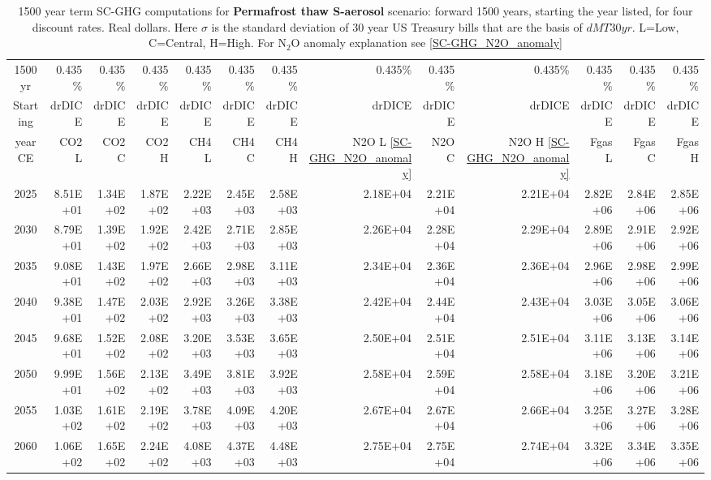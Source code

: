 \documentclass{article}
\begin{document}
\begin{table}
   \caption{1500 year term SC-GHG computations for \textbf{Permafrost thaw S-aerosol} scenario: forward 1500 years, starting the year listed, for four discount rates. Real dollars. Here $\sigma$ is the standard deviation of 30 year US Treasury bills that are the basis of $dMT30yr$. L=Low, C=Central, H=High. For N$_2$O anomaly explanation see \ref{SC-GHG_N2O_anomaly}} 
\label{PVs_1500_yearSCC_SH4}
\small
\begin{tabular}{crrr|rrr|rrr|rrr}
1500 yr  & 0.435\%  & 0.435\%  & 0.435\%  & 0.435\%  & 0.435\%  & 0.435\%  & 0.435\%  & 0.435\%  & 0.435\%  & 0.435\%  & 0.435\%  & 0.435\%  \\
Starting & drDICE   & drDICE   & drDICE   & drDICE   & drDICE   & drDICE   & drDICE   & drDICE   & drDICE   & drDICE   & drDICE   & drDICE   \\
year CE  & CO2 L    & CO2 C    & CO2 H    & CH4 L    & CH4 C    & CH4 H    & N2O L \ref{SC-GHG_N2O_anomaly}     & N2O C      & N2O H \ref{SC-GHG_N2O_anomaly}    & Fgas L   & Fgas C   & Fgas H   \\
2025     & 8.51E+01 & 1.34E+02 & 1.87E+02 & 2.22E+03 & 2.45E+03 & 2.58E+03 & 2.18E+04 & 2.21E+04 & 2.21E+04 & 2.82E+06 & 2.84E+06 & 2.85E+06 \\
2030     & 8.79E+01 & 1.39E+02 & 1.92E+02 & 2.42E+03 & 2.71E+03 & 2.85E+03 & 2.26E+04 & 2.28E+04 & 2.29E+04 & 2.89E+06 & 2.91E+06 & 2.92E+06 \\
2035     & 9.08E+01 & 1.43E+02 & 1.97E+02 & 2.66E+03 & 2.98E+03 & 3.11E+03 & 2.34E+04 & 2.36E+04 & 2.36E+04 & 2.96E+06 & 2.98E+06 & 2.99E+06 \\
2040     & 9.38E+01 & 1.47E+02 & 2.03E+02 & 2.92E+03 & 3.26E+03 & 3.38E+03 & 2.42E+04 & 2.44E+04 & 2.43E+04 & 3.03E+06 & 3.05E+06 & 3.06E+06 \\
2045     & 9.68E+01 & 1.52E+02 & 2.08E+02 & 3.20E+03 & 3.53E+03 & 3.65E+03 & 2.50E+04 & 2.51E+04 & 2.51E+04 & 3.11E+06 & 3.13E+06 & 3.14E+06 \\
2050     & 9.99E+01 & 1.56E+02 & 2.13E+02 & 3.49E+03 & 3.81E+03 & 3.92E+03 & 2.58E+04 & 2.59E+04 & 2.58E+04 & 3.18E+06 & 3.20E+06 & 3.21E+06 \\
2055     & 1.03E+02 & 1.61E+02 & 2.19E+02 & 3.78E+03 & 4.09E+03 & 4.20E+03 & 2.67E+04 & 2.67E+04 & 2.66E+04 & 3.25E+06 & 3.27E+06 & 3.28E+06 \\
2060     & 1.06E+02 & 1.65E+02 & 2.24E+02 & 4.08E+03 & 4.37E+03 & 4.48E+03 & 2.75E+04 & 2.75E+04 & 2.74E+04 & 3.32E+06 & 3.34E+06 & 3.35E+06 \\

\end{tabular}
\end{table}
\end{document}
